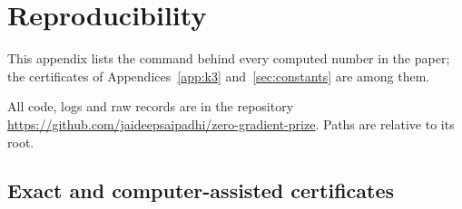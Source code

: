 \section{Reproducibility}\label{app:repro}

This appendix lists the command behind every computed number in the paper; the certificates of Appendices~\ref{app:k3} and~\ref{sec:constants} are among them.

All code, logs and raw records are in the repository \url{https://github.com/jaideepsaipadhi/zero-gradient-prize}. Paths are relative to its root. %

\subsection*{Exact and computer-assisted certificates}
